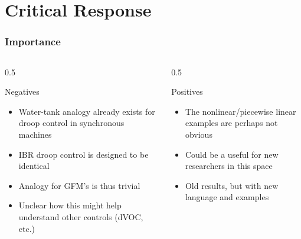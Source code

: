 \documentclass[
    aspectratio=169,
    \ifdefined\HANDOUT
    handout
    \else
    \fi
]{beamer}
\begin{document}
\section{Critical Response}
\begin{frame}
    \frametitle{Importance}
    \begin{columns}
        \begin{column}{0.5\textwidth}
            \begin{block}{Negatives}
                \begin{itemize}
                    \item Water-tank analogy already exists for droop control in synchronous machines
                    \item IBR droop control is designed to be identical
                    \item Analogy for GFM's is thus trivial
                    \item Unclear how this might help understand other controls (dVOC, etc.)
                \end{itemize}
            \end{block}
        \end{column}
        \begin{column}{0.5\textwidth}
            \begin{block}{Positives}
                \begin{itemize}
                    \item The nonlinear/piecewise linear examples are perhaps not obvious
                    \item Could be a useful for new researchers in this space
                    \item Old results, but with new language and examples
                \end{itemize}
            \end{block}
        \end{column}
    \end{columns}
\end{frame}
\end{document}

